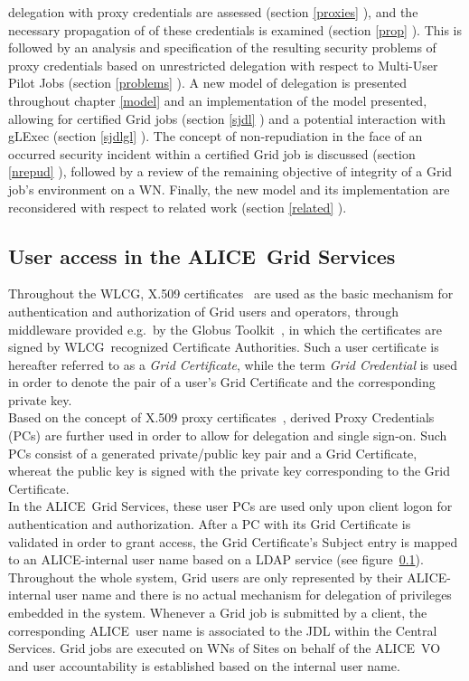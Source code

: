 \documentclass[10pt]{iopart}
\newcommand{\alice}{ALICE}
\newcommand{\wlcg}{WLCG}
\begin{document}
delegation with proxy credentials are assessed (section \ref{proxies} ), and
the necessary propagation of of these credentials is examined
(section \ref{prop} ). This is followed by an analysis and specification of the
resulting security problems of proxy credentials based on unrestricted
delegation with respect to Multi-User Pilot Jobs (section \ref{problems} ).
A new model of delegation is presented throughout
chapter \ref{model} and an implementation of the model presented, allowing for
certified Grid jobs (section \ref{sjdl} ) and a potential interaction with gLExec
(section \ref{sjdlgl} ). The concept of non-repudiation in the face of an
occurred security incident within a certified Grid job is discussed (section
\ref{nrepud} ), followed by a review of the remaining objective of integrity of
a Grid job's environment on a WN. Finally, the new model and its implementation 
are reconsidered with respect to related work (section \ref{related} ).

\subsection{User access in the \alice\ Grid Services}
\label{supj}
Throughout the \wlcg, X.509 certificates~\cite{rfc5280} are used as the
basic mechanism for authentication and authorization of Grid users and
operators, through middleware provided e.g.\ by the Globus Toolkit~\cite{globus}, in which the
certificates are signed by \wlcg\
recognized Certificate Authorities. Such a user certificate is hereafter
referred to as a \textit{Grid Certificate}, while the term \textit{Grid
Credential} is used in order to denote the pair of a user's Grid Certificate
and the corresponding private key.\\
Based on the concept of X.509 proxy certificates~\cite{proxy,rfc3820}, derived
Proxy Credentials (PCs) are further used in order to allow for delegation and
single sign-on. Such PCs consist of a generated private/public key pair
and a Grid Certificate, whereat the public key is signed with the private
key corresponding to the Grid Certificate.\\
In the \alice\ Grid Services, these user PCs are used only upon client
logon for authentication and authorization. After a PC with its Grid
Certificate is validated in order to grant access, the Grid Certificate's
Subject entry is mapped to an \alice-internal user name based on a LDAP service
(see figure~\ref{supj}).
Throughout the whole system, Grid users are only represented by their 
\alice-internal user name and there is no actual mechanism for delegation of
privileges embedded in the system. Whenever a Grid job is submitted
by a client, the corresponding \alice\ user name is associated to the JDL within
the Central Services. Grid jobs are executed on WNs of Sites on behalf of the
\alice\ VO and user accountability is established based on the internal user name.
\end{document}
